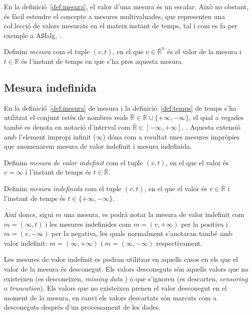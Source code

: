 En la definició~\ref{def:mesura}, el valor d'una mesura és un
escalar. Això no obstant, és fàcil estendre el concepte a mesures
multivaluades, que representen una co\l.lecció de valors
mesurats en el mateix instant de temps, tal i com es fa per exemple a
A\ss falg, \cite{assfalg08:_advan_analy_temp}.

\begin{definition}
  Definim \emph{mesura} com el tuple $(v,t)$, en el que
  $v\in\bar{\mathbb{R}}^n$ és el valor de la mesura i $t \in
  \mathbb{R}$ és l'instant de temps en que s'ha pres aquesta mesura.
\end{definition}


\subsection{Mesura indefinida}\label{sec:mesura_indefinida}

En la definició~\ref{def:mesura} de mesura i la
definició~\ref{def:temps} de temps s'ha utilitzat el conjunt estès de
nombres reals $\bar{\mathbb{R}} \in \mathbb{R} \cup
\{+\infty,-\infty\}$, el qual a vegades també es denota en notació
d'interval com $\bar{\mathbb{R}} \in [-\infty,+\infty]$,
\cite{cantrell:extendedreal}. Aquesta extensió amb l'element impropi
infinit ($\infty$) dóna com a resultat unes mesures impròpies que
anomenarem mesura de valor indefinit i mesura indefinida.

\begin{definition}
  Definim \emph{mesura de valor indefinit} com el tuple $(v,t)$, en el
  que el valor és $v=\infty$ i l'instant de temps és
  $t\in\bar{\mathbb{R}}$.
\end{definition}

\begin{definition}
  Definim \emph{mesura indefinida} com el tuple $(v,t)$, en el que el
  valor és $v\in\bar{\mathbb{R}}$ i l'instant de temps és
  $t\in\{+\infty,-\infty\}$.
\end{definition}

Així doncs, sigui $m$ una mesura, es podrà notar la mesura de valor indefinit com  $m=(\infty,t)$ i les mesures indefinides com $m=(v,+\infty)$ per la positiva  i $m=(v,-\infty)$ per la negativa, les quals normalment s'anotaran també amb valor indefinit: $m=(\infty,+\infty)$ i $m=(\infty,-\infty)$ respectivament.


Les mesures de valor indefinit es podran utilitzar en aquells casos en els que el valor de la mesura és desconegut. Els valors desconeguts  són aquells valors que no existeixen (es desconeixen, \emph{missing data} ) o que s'ignoren (es descarten, \emph{censoring} o \emph{truncation}). Els valors que no existeixen prenen el valor desconegut en el moment de la mesura, en canvi els valors descartats són marcats com a desconeguts després d'un processament de les dades. 

